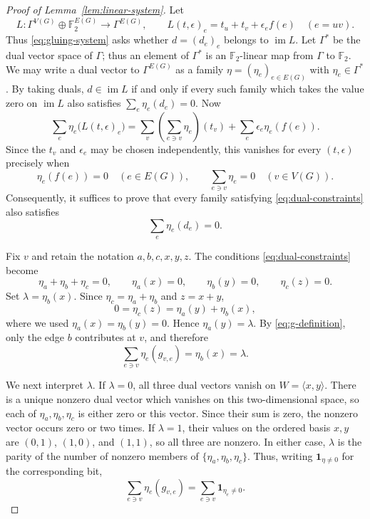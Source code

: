 \documentclass{amsart}
\newcommand{\F}{\mathbb{F}}
\newcommand{\ind}{\mathbf{1}}
\newcommand{\im}{\operatorname{im}}
\begin{document}
\begin{proof}[Proof of Lemma~\ref{lem:linear-system}]
Let
\[
  L:\Gamma^{V(G)}\oplus\F_2^{E(G)}\longrightarrow\Gamma^{E(G)},
  \qquad
  L(t,\epsilon)_e=t_u+t_v+\epsilon_e f(e)\quad(e=uv).
\]
Thus \eqref{eq:gluing-system} asks whether $d=(d_e)_e$ belongs to $\im L$.
Let $\Gamma^*$ be the dual vector space of $\Gamma$; thus an element of
$\Gamma^*$ is an $\F_2$-linear map from $\Gamma$ to $\F_2$. We may write a
dual vector to $\Gamma^{E(G)}$ as a family
$\eta=(\eta_e)_{e\in E(G)}$ with $\eta_e\in\Gamma^*$. By taking duals,
$d\in\im L$ if and only if every such family which takes the value zero on
$\im L$ also satisfies $\sum_e\eta_e(d_e)=0$. Now
\[
  \sum_e\eta_e\bigl(L(t,\epsilon)_e\bigr)
  =\sum_v\left(\sum_{e\ni v}\eta_e\right)(t_v)
   +\sum_e\epsilon_e\eta_e(f(e)).
\]
Since the $t_v$ and $\epsilon_e$ may be chosen independently, this vanishes for
every $(t,\epsilon)$ precisely when
\begin{equation}\label{eq:dual-constraints}
  \eta_e(f(e))=0\quad(e\in E(G)),
  \qquad
  \sum_{e\ni v}\eta_e=0\quad(v\in V(G)).
\end{equation}
Consequently, it suffices to prove that every family satisfying
\eqref{eq:dual-constraints} also satisfies
\begin{equation}\label{eq:d-annihilated}
  \sum_e\eta_e(d_e)=0.
\end{equation}

Fix $v$ and retain the notation $a,b,c,x,y,z$. The conditions
\eqref{eq:dual-constraints} become
\begin{equation}\label{eq:local-dual-constraints}
  \eta_a+\eta_b+\eta_c=0,
  \qquad
  \eta_a(x)=0,
  \qquad
  \eta_b(y)=0,
  \qquad
  \eta_c(z)=0.
\end{equation}
Set $\lambda=\eta_b(x)$. Since $\eta_c=\eta_a+\eta_b$ and $z=x+y$,
\[
  0=\eta_c(z)=\eta_a(y)+\eta_b(x),
\]
where we used $\eta_a(x)=\eta_b(y)=0$. Hence $\eta_a(y)=\lambda$. By
\eqref{eq:g-definition}, only the edge $b$ contributes at $v$, and therefore
\begin{equation}\label{eq:local-g-sum}
  \sum_{e\ni v}\eta_e(g_{v,e})=\eta_b(x)=\lambda.
\end{equation}

We next interpret $\lambda$. If $\lambda=0$, all three dual vectors vanish on
$W=\langle x,y\rangle$. There is a unique nonzero dual vector which vanishes on
this two-dimensional space, so each of $\eta_a,\eta_b,\eta_c$ is either zero or
this vector. Since their sum is zero, the nonzero vector occurs zero or two
times. If $\lambda=1$, their values on the ordered basis $x,y$ are $(0,1)$,
$(1,0)$, and $(1,1)$, so all three are nonzero. In either case, $\lambda$ is
the parity of the number of nonzero members of
$\{\eta_a,\eta_b,\eta_c\}$. Thus, writing $\ind_{\eta\ne 0}$ for the
corresponding bit,
\begin{equation}\label{eq:local-parity}
  \sum_{e\ni v}\eta_e(g_{v,e})
  =\sum_{e\ni v}\ind_{\eta_e\ne 0}.
\end{equation}


\end{proof}
\end{document}
